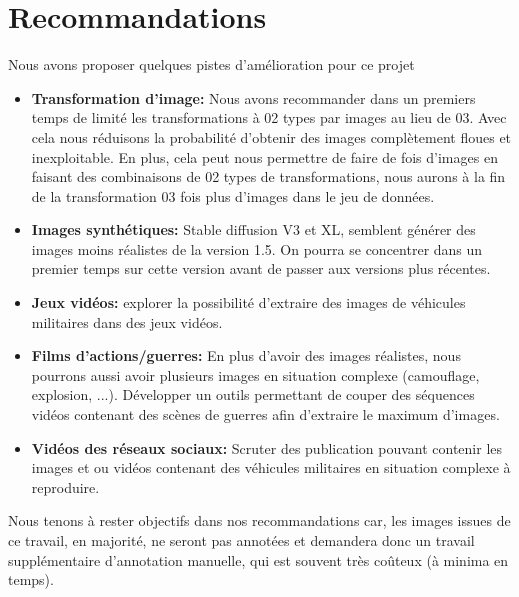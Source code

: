 \section{Recommandations}
Nous avons proposer quelques pistes d'amélioration pour ce projet

\begin{itemize}
    \item \textbf{Transformation d'image:} Nous avons recommander dans un premiers temps de limité les transformations à 02 types par images au lieu de 03. Avec cela nous réduisons la probabilité d'obtenir des images complètement floues et inexploitable. En plus, cela peut nous permettre de faire de fois d'images en faisant des combinaisons de 02 types de transformations, nous aurons à la fin de la transformation 03 fois plus d'images dans le jeu de données.
    \item \textbf{Images synthétiques:} Stable diffusion V3 et XL, semblent générer des images moins réalistes de la version 1.5. On pourra se concentrer dans un premier temps sur cette version avant de passer aux versions plus récentes.
    \item \textbf{Jeux vidéos:} explorer la possibilité d'extraire des images de véhicules militaires dans des jeux vidéos.
    \item \textbf{Films d'actions/guerres: } En plus d'avoir des images réalistes, nous pourrons aussi avoir plusieurs images en situation complexe (camouflage, explosion, ...). Développer un outils permettant de couper des séquences vidéos contenant des scènes de guerres afin d'extraire le maximum d'images.
    \item \textbf{Vidéos des réseaux sociaux: } Scruter des publication pouvant contenir les images et ou vidéos contenant des véhicules militaires en situation complexe à reproduire.
\end{itemize}

Nous tenons à rester objectifs dans nos recommandations car, les images issues de ce travail, en majorité, ne seront pas annotées  et demandera donc un travail supplémentaire d’annotation manuelle, qui est souvent très coûteux (à minima en temps).
